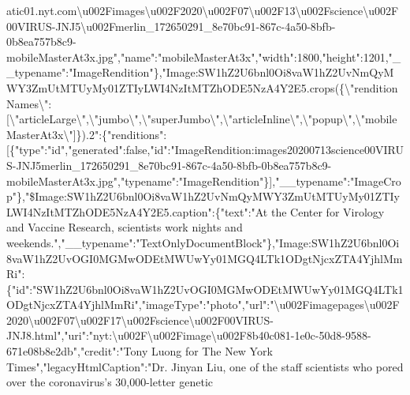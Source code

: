 atic01.nyt.com\textbackslash{}u002Fimages\textbackslash{}u002F2020\textbackslash{}u002F07\textbackslash{}u002F13\textbackslash{}u002Fscience\textbackslash{}u002F00VIRUS-JNJ5\textbackslash{}u002Fmerlin\_172650291\_8e70bc91-867c-4a50-8bfb-0b8ea757b8c9-mobileMasterAt3x.jpg","name":"mobileMasterAt3x","width":1800,"height":1201,"\_\_typename":"ImageRendition"\},"Image:SW1hZ2U6bnl0Oi8vaW1hZ2UvNmQyMWY3ZmUtMTUyMy01ZTIyLWI4NzItMTZhODE5NzA4Y2E5.crops(\{\textbackslash{}"renditionNames\textbackslash{}":{[}\textbackslash{}"articleLarge\textbackslash{}",\textbackslash{}"jumbo\textbackslash{}",\textbackslash{}"superJumbo\textbackslash{}",\textbackslash{}"articleInline\textbackslash{}",\textbackslash{}"popup\textbackslash{}",\textbackslash{}"mobileMasterAt3x\textbackslash{}"{]}\}).2":\{"renditions":{[}\{"type":"id","generated":false,"id":"ImageRendition:images20200713science00VIRUS-JNJ5merlin\_172650291\_8e70bc91-867c-4a50-8bfb-0b8ea757b8c9-mobileMasterAt3x.jpg","typename":"ImageRendition"\}{]},"\_\_typename":"ImageCrop"\},"\$Image:SW1hZ2U6bnl0Oi8vaW1hZ2UvNmQyMWY3ZmUtMTUyMy01ZTIyLWI4NzItMTZhODE5NzA4Y2E5.caption":\{"text":"At
the Center for Virology and Vaccine Research, scientists work nights and
weekends.","\_\_typename":"TextOnlyDocumentBlock"\},"Image:SW1hZ2U6bnl0Oi8vaW1hZ2UvOGI0MGMwODEtMWUwYy01MGQ4LTk1ODgtNjcxZTA4YjhlMmRi":\{"id":"SW1hZ2U6bnl0Oi8vaW1hZ2UvOGI0MGMwODEtMWUwYy01MGQ4LTk1ODgtNjcxZTA4YjhlMmRi","imageType":"photo","url":"\textbackslash{}u002Fimagepages\textbackslash{}u002F2020\textbackslash{}u002F07\textbackslash{}u002F17\textbackslash{}u002Fscience\textbackslash{}u002F00VIRUS-JNJ8.html","uri":"nyt:\textbackslash{}u002F\textbackslash{}u002Fimage\textbackslash{}u002F8b40c081-1e0c-50d8-9588-671e08b8e2db","credit":"Tony
Luong for The New York Times","legacyHtmlCaption":"Dr. Jinyan Liu, one
of the staff scientists who pored over the coronavirus's 30,000-letter
genetic

